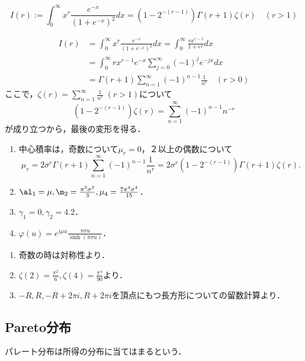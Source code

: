 \documentclass[uplatex,dvipdfmx]{jsreport}
\begin{document}
\begin{lemma}
    \[I(r):=\int^\infty_0x^r\frac{e^{-x}}{(1+e^{-x})^2}dx=(1-2^{-(r-1)})\Gamma(r+1)\zeta(r)\quad(r>1)\]
\end{lemma}
\begin{Proof}
    \begin{align*}
        I(r)&=\int^\infty_0x^r\frac{e^{-x}}{(1+e^{-x})^2}dx=\int^\infty_0\frac{rx^{r-1}}{1+e^x}dx\\
        &=\int^\infty_0rx^{r-1}e^{-x}\sum^\infty_{j=0}(-1)^je^{-jx}dx\\
        &=\Gamma(r+1)\sum^\infty_{n=1}(-1)^{n-1}\frac{1}{n^r}\quad(r>0)
    \end{align*}
    ここで，$\zeta(r)=\sum^\infty_{n=1}\frac{1}{n^r}\;(r>1)$について
    \[(1-2^{-(r-1)})\zeta(r)=\sum^\infty_{n=1}(-1)^{n-1}n^{-r}\]
    が成り立つから，最後の変形を得る．
\end{Proof}

\begin{proposition}\mbox{}
    \begin{enumerate}
        \item 中心積率は，奇数について$\mu_r=0$，２以上の偶数について
        \[\mu_r=2\sigma^r\Gamma(r+1)\sum^\infty_{n=1}(-1)^{n-1}\frac{1}{n^r}=2\sigma^r(1-2^{-(r-1)})\Gamma(r+1)\zeta(r).\]
        \item $\al_1=\mu,\m_2=\frac{\pi^2\sigma^2}{3},\mu_4=\frac{7\pi^4\sigma^4}{15}$．
        \item $\gamma_1=0,\gamma_2=4.2$．
        \item $\varphi(u)=e^{i\mu u}\frac{\pi\sigma u}{\sinh(\pi\sigma u)}$．
    \end{enumerate}
\end{proposition}
\begin{Proof}\mbox{}
    \begin{enumerate}
        \item 奇数の時は対称性より．
        \item $\zeta(2)=\frac{\pi^2}{6},\zeta(4)=\frac{\pi^4}{90}$より．
        \item $-R,R,-R+2\pi i,R+2\pi i$を頂点にもつ長方形についての留数計算より．
    \end{enumerate}
\end{Proof}

\subsection{Pareto分布}

\begin{tcolorbox}[colframe=ForestGreen, colback=ForestGreen!10!white,breakable,colbacktitle=ForestGreen!40!white,coltitle=black,fonttitle=\bfseries\sffamily,
title=]
    パレート分布は所得の分布に当てはまるという．
\end{tcolorbox}
\end{document}
